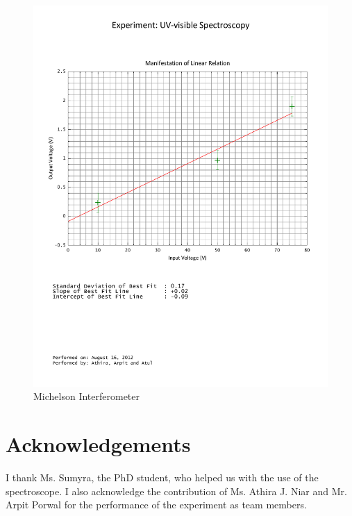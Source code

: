 	\begin{figure}[bth]
		\begin{center}
			\includegraphics[width=\linewidth]{gfx/1A_bestfit.pdf}
		\end{center}
	\caption[Michelson Interferometer]{Michelson Interferometer}
	\label{1A_graph}
	\end{figure}

\section{Acknowledgements}
I thank Ms. Sumyra, the PhD student, who helped us with the use of the spectroscope. I also acknowledge the contribution of Ms. Athira J. Niar and Mr. Arpit Porwal for the performance of the experiment as team members.